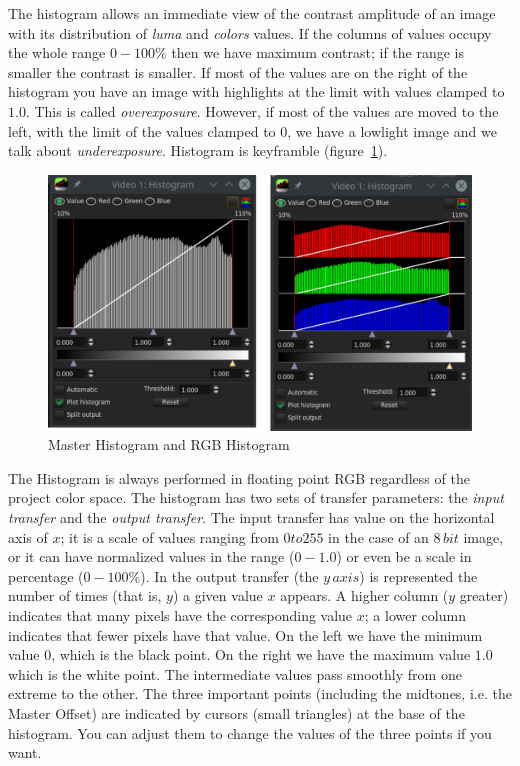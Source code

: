 The histogram allows an immediate view of the contrast amplitude of an image with its distribution of \textit{luma} and \textit{colors} values. If the columns of values occupy the whole range $0-100\%$ then we have maximum contrast; if the range is smaller the contrast is smaller. If most of the values are on the right of the histogram you have an image with highlights at the limit with values clamped to $1.0$. This is called \textit{overexposure}. However, if most of the values are moved to the left, with the limit of the values clamped to $0$, we have a lowlight image and we talk about \textit{underexposure}. Histogram is keyframble (figure~\ref{fig:histogram}).

\begin{figure}[htpb]
    \centering
    \includegraphics[width=0.8\linewidth]{images/histogram.png}
    \caption{Master Histogram and RGB Histogram}
    \label{fig:histogram}
\end{figure} 

The Histogram is always performed in floating point RGB regardless of the project color space. The histogram has two sets of transfer parameters: the \textit{input transfer} and the \textit{output transfer}. The input transfer has value on the horizontal axis of $x$; it is a scale of values ranging from $0 to 255$ in the case of an $8\,bit$ image, or it can have normalized values in the range ($0-1.0$) or even be a scale in percentage ($0-100\%$). In the output transfer (the $y\,axis$) is represented the number of times (that is, $y$) a given value $x$ appears. A higher column ($y$ greater) indicates that many pixels have the corresponding value $x$; a lower column indicates that fewer pixels have that value. On the left we have the minimum value $0$, which is the black point. On the right we have the maximum value $1.0$ which is the white point. The intermediate values pass smoothly from one extreme to the other. The three important points (including the midtones, i.e. the Master Offset) are indicated by cursors (small triangles) at the base of the histogram. You can adjust them to change the values of the three points if you want.


